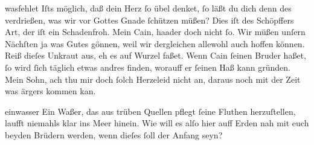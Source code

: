 \documentclass[tocstyle=ref-genre]{ees}
\begin{document}
{\begin{movement}{wasfehlet}
  \voice[Eva]
  Iſts möglich, daß dein Herz ſo übel denket,
  ſo läßt du dich denn des verdrießen,
  was wir vor Gottes Gnade ſchützen müßen?
  Dies iſt des Schöpffers Art, der iſt ein Schadenfroh.
  Mein Cain, haader doch nicht ſo.
  Wir müßen unſern Nächſten ja was Gutes gönnen,
  weil wir dergleichen allewohl auch hoffen können.
  Reiß dieſes Unkraut aus, eh es auf Wurzel faßet.
  Wenn Cain ſeinen Bruder haßet,
  ſo wird ſich täglich etwas andres finden,
  worauff er ſeinen Haß kann gründen.
  Mein Sohn, ach thu mir doch ſolch Herzeleid nicht an,
  daraus noch mit der Zeit was ärgers kommen kan.
\end{movement}

\begin{movement}{einwasser}
  \voice[Eva]
  Ein Waßer, das aus trüben Quellen
  pflegt ſeine Fluthen herzuſtellen,
  laufft niemahls klar ins Meer hinein.
  Wie will es alſo hier auff Erden
  nah mit euch beyden Brüdern werden,
  wenn dieſes ſoll der Anfang seyn?
\end{movement}





}

\eesScore
\end{document}
